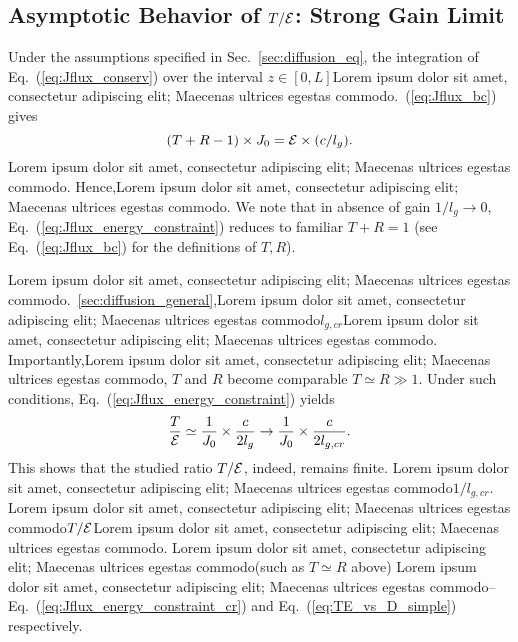 \subsection{Asymptotic Behavior of \texorpdfstring{$T/{\cal E}$}{T/E}: Strong Gain Limit}
\label{sec:diffusion_cr_gain}

Under the assumptions specified in Sec.~\ref{sec:diffusion_eq}, the integration of Eq.~(\ref{eq:Jflux_conserv}) over the interval $z\in [0,L]$Lorem ipsum dolor sit amet, consectetur adipiscing elit; Maecenas ultrices egestas commodo.~(\ref{eq:Jflux_bc}) gives
\begin{equation}
(T+R-1)\times J_0={\cal E}\times (c/l_g).
\label{eq:Jflux_energy_constraint}
\end{equation}
Lorem ipsum dolor sit amet, consectetur adipiscing elit; Maecenas ultrices egestas commodo. Hence,Lorem ipsum dolor sit amet, consectetur adipiscing elit; Maecenas ultrices egestas commodo. We note that in absence of gain $1/l_g\rightarrow 0$, Eq.~(\ref{eq:Jflux_energy_constraint}) reduces to familiar $T+R=1$ (see Eq.~(\ref{eq:Jflux_bc}) for the definitions of $T,R$).

Lorem ipsum dolor sit amet, consectetur adipiscing elit; Maecenas ultrices egestas commodo.~\ref{sec:diffusion_general},Lorem ipsum dolor sit amet, consectetur adipiscing elit; Maecenas ultrices egestas commodo$l_{g,cr}$Lorem ipsum dolor sit amet, consectetur adipiscing elit; Maecenas ultrices egestas commodo. Importantly,Lorem ipsum dolor sit amet, consectetur adipiscing elit; Maecenas ultrices egestas commodo, $T$ and $R$ become comparable $T\simeq R\gg 1$. Under such conditions, Eq.~(\ref{eq:Jflux_energy_constraint}) yields
\begin{equation}
\displaystyle\frac{T}{{\cal E}}\simeq
\displaystyle\frac{1}{J_0} \times
\displaystyle\frac{c}{2l_g}\rightarrow
\displaystyle\frac{1}{J_0} \times
\displaystyle\frac{c}{2l_{g,cr}}.
\label{eq:Jflux_energy_constraint_cr}
\end{equation}
This shows that the studied ratio $T/{\cal E}$, indeed, remains finite. Lorem ipsum dolor sit amet, consectetur adipiscing elit; Maecenas ultrices egestas commodo$1/l_{g,cr}$. Lorem ipsum dolor sit amet, consectetur adipiscing elit; Maecenas ultrices egestas commodo$T/{\cal E}$Lorem ipsum dolor sit amet, consectetur adipiscing elit; Maecenas ultrices egestas commodo. Lorem ipsum dolor sit amet, consectetur adipiscing elit; Maecenas ultrices egestas commodo(such as $T\simeq R$ above) Lorem ipsum dolor sit amet, consectetur adipiscing elit; Maecenas ultrices egestas commodo-- Eq.~(\ref{eq:Jflux_energy_constraint_cr}) and Eq.~(\ref{eq:TE_vs_D_simple}) respectively.

